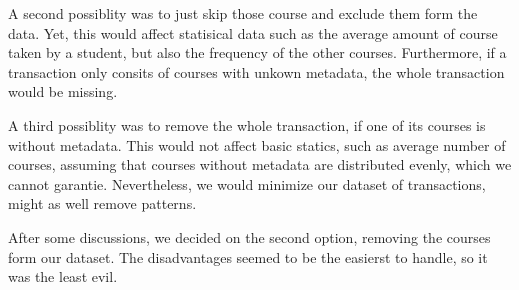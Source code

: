 A second possiblity was to just skip those course and exclude them form the data. Yet, this would affect
statisical data such as the average amount of course taken by a student, but also the frequency of the other courses.
Furthermore, if a transaction only consits of courses with unkown metadata, the whole transaction would be missing.


A third possiblity was to remove the whole transaction, if one of its courses is without metadata. 
This would not affect basic statics, such as average number of courses, assuming that courses without metadata are distributed evenly, which we cannot garantie.
Nevertheless, we would minimize our dataset of transactions, might as well remove patterns.
\newline

After some discussions, we decided on the second option, removing the courses form our dataset. The disadvantages seemed to be the easierst to handle, so it was the least evil. 




